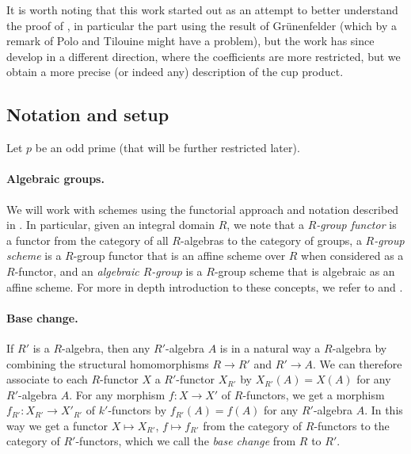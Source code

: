 It is worth noting that this work started out as an attempt to better understand the proof of \cite[Theorem~7.1]{GK}, in particular the part using the result of Grünenfelder (which by a remark of Polo and Tilouine might have a problem), but the work has since develop in a different direction, where the coefficients are more restricted, but we obtain a more precise (or indeed any) description of the cup product.

\subsection{Notation and setup}

Let $p$ be an odd prime (that will be further restricted later).

\paragraph{Algebraic groups.} We will work with schemes using the functorial approach and notation described in \cite{Jan}. In particular, given an integral domain $R$, we note that a \emph{$R$-group functor} is a functor from the category of all $R$-algebras to the category of groups, a \emph{$R$-group scheme} is a $R$-group functor that is an affine scheme over $R$ when considered as a $R$-functor, and an \emph{algebraic $R$-group} is a $R$-group scheme that is algebraic as an affine scheme. For more in depth introduction to these concepts, we refer to \cite{Con-book} and \cite{Jan}.

\paragraph{Base change.} If $R'$ is a $R$-algebra, then any $R'$-algebra $A$ is in a natural way a $R$-algebra by combining the structural homomorphisms $R \to R'$ and $R' \to A$. We can therefore associate to each $R$-functor $X$ a $R'$-functor $X_{R'}$ by $X_{R'}(A) = X(A)$ for any $R'$-algebra $A$. For any morphism $f \colon X \to X'$ of $R$-functors, we get a morphism $f_{R'} \colon X_{R'} \to X'_{R'}$ of $k'$-functors by $f_{R'}(A) = f(A)$ for any $R'$-algebra $A$. In this way we get a functor $X \mapsto X_{R'}$, $f \mapsto f_{R'}$ from the category of $R$-functors to the category of $R'$-functors, which we call the \emph{base change} from $R$ to $R'$.

